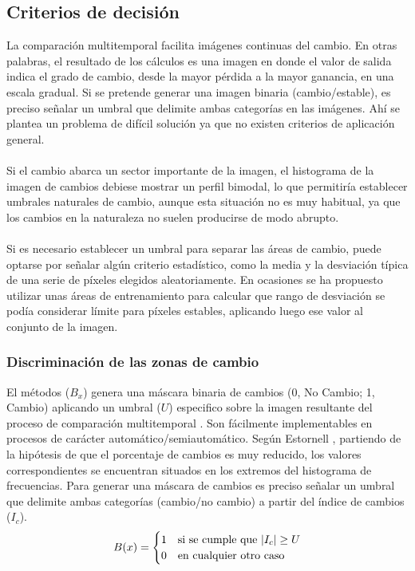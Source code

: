 \subsection{Criterios de decisi\'on}
La comparaci\'on multitemporal facilita im\'agenes continuas del cambio. En otras palabras, el resultado de los c\'alculos es una imagen en donde el valor de salida indica el grado de cambio, desde la mayor p\'erdida a la mayor ganancia, en una escala gradual. Si se pretende generar una imagen binaria (cambio/estable), es preciso se\~{n}alar un umbral que delimite ambas categor\'ias en las im\'agenes. Ah\'i se plantea un problema de dif\'icil soluci\'on ya que no existen criterios de aplicación general.\\~\\
Si el cambio abarca un sector importante de la imagen, el histograma de la imagen de cambios debiese mostrar un perfil bimodal, lo que permitir\'ia establecer umbrales naturales de cambio, aunque esta situaci\'on no es muy habitual, ya que los cambios en la naturaleza no suelen producirse de modo abrupto\cite{martinez2013normalizacion}.\\~\\
Si es necesario establecer un umbral para separar las \'areas de cambio, puede optarse por se\~{n}alar alg\'un criterio estad\'istico, como la media y la desviaci\'on t\'ipica de una serie de p\'ixeles elegidos aleatoriamente. En ocasiones se ha propuesto utilizar unas \'areas de entrenamiento para calcular que rango de desviaci\'on se pod\'ia considerar l\'imite para p\'ixeles estables, aplicando luego ese valor al conjunto de la imagen\cite{tung1988determination}.

\subsubsection{Discriminaci\'on de las zonas de cambio}
El m\'etodos ($ B_{x} $) genera una m\'ascara binaria de cambios (0, No Cambio; 1, Cambio) aplicando un umbral ($ U $) especifico sobre la imagen resultante del proceso de comparaci\'on multitemporal \cite{singh1989review}. Son f\'acilmente implementables en procesos de car\'acter autom\'atico/semiautom\'atico. Según Estornell \cite{estornell2004analisis}, partiendo de la hip\'otesis de que el porcentaje de cambios es muy reducido, los valores correspondientes se encuentran situados en los extremos del histograma de frecuencias. Para generar una m\'ascara de cambios es preciso se\~{n}alar un umbral que delimite ambas categorías (cambio/no cambio) a partir del \'indice de cambios ($ I_{c} $)\cite{radke2005image}.	
\begin{equation}
B(x) = \begin{cases}
1 & \text{si se cumple que } \lvert I_c\rvert \geq U \\
0 & \text{en cualquier otro caso}
\end{cases}
\end{equation}

